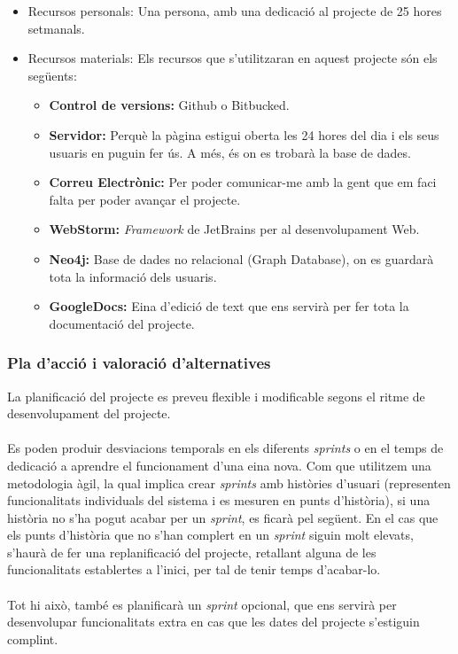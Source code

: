 \documentclass[11pt,catalan,listoffigures,listoftables]{tfgetsinf}
\begin{document}
\begin{itemize}
	\item Recursos personals: Una persona, amb una dedicació al projecte de 25 hores setmanals.
	\item Recursos materials: Els recursos que s’utilitzaran en aquest projecte són els següents:
	\begin{itemize}
		\item \textbf{Control de versions:} Github o Bitbucked.
		\item \textbf{Servidor:} Perquè la pàgina estigui oberta les 24 hores del dia i els seus usuaris en puguin fer ús. A més, és on es trobarà la base de dades.
		\item \textbf{Correu Electrònic:} Per poder comunicar-me amb la gent que em faci falta per poder avançar el projecte.
		\item \textbf{WebStorm:} \textit{Framework} de JetBrains per al desenvolupament Web.
		\item \textbf{Neo4j:} Base de dades no relacional (Graph Database), on es guardarà tota la informació dels usuaris.
		\item \textbf{GoogleDocs:} Eina d’edició de text que ens servirà per fer tota la documentació del projecte.
	\end{itemize}
\end{itemize}

\subsubsection{Pla d’acció i valoració d’alternatives}

La planificació del projecte es preveu flexible i modificable segons el ritme de desenvolupament del projecte.\\ \\
Es poden produir desviacions temporals en els diferents \textit{sprints} o en el temps de dedicació a aprendre el funcionament d’una eina nova. Com que utilitzem una metodologia àgil, la qual implica crear \textit{sprints} amb històries d’usuari (representen funcionalitats individuals del sistema i es mesuren en punts d’història), si una història no s’ha pogut acabar per un \textit{sprint}, es ficarà pel següent. En el cas que els punts d’història que no s’han complert en un \textit{sprint} siguin molt elevats, s’haurà de fer una replanificació del projecte, retallant alguna de les funcionalitats establertes a l’inici, per tal de tenir temps d’acabar-lo.\\ \\
Tot hi això, també es planificarà un \textit{sprint} opcional, que ens servirà per desenvolupar funcionalitats extra en cas que les dates del projecte s’estiguin complint.
\end{document}
